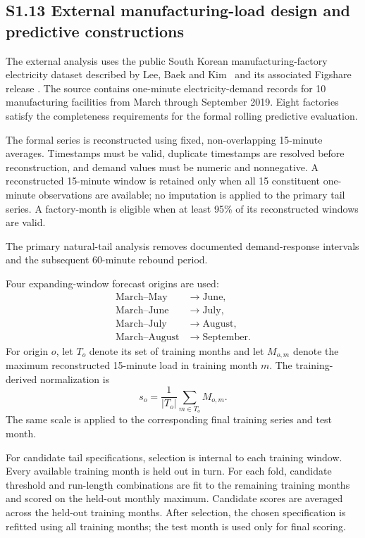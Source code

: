 \documentclass[]{interact}
\begin{document}

\subsection*{S1.13 External manufacturing-load design and predictive constructions}

The external analysis uses the public South Korean
manufacturing-factory electricity dataset described by Lee, Baek and
Kim~\cite{Lee2022} and its associated Figshare release
\cite{LeeFigshare}. The source contains one-minute electricity-demand
records for 10 manufacturing facilities from March through September
2019. Eight factories satisfy the completeness requirements for the
formal rolling predictive evaluation.

The formal series is reconstructed using fixed, non-overlapping
15-minute averages. Timestamps must be valid, duplicate timestamps are
resolved before reconstruction, and demand values must be numeric and
nonnegative. A reconstructed 15-minute window is retained only when
all 15 constituent one-minute observations are available; no
imputation is applied to the primary tail series. A factory-month is
eligible when at least 95\% of its reconstructed windows are valid.

The primary natural-tail analysis removes documented demand-response
intervals and the subsequent 60-minute rebound period.

Four expanding-window forecast origins are used:
\[
\begin{aligned}
\text{March--May}&\rightarrow\text{June},\\
\text{March--June}&\rightarrow\text{July},\\
\text{March--July}&\rightarrow\text{August},\\
\text{March--August}&\rightarrow\text{September}.
\end{aligned}
\]
For origin \(o\), let \(T_o\) denote its set of training months and
let \(M_{o,m}\) denote the maximum reconstructed 15-minute load in
training month \(m\). The training-derived normalization is
\[
s_o
=
\frac{1}{|T_o|}
\sum_{m\in T_o}
M_{o,m}.
\]
The same scale is applied to the corresponding final training series
and test month.

For candidate tail specifications, selection is internal to each
training window. Every available training month is held out in turn.
For each fold, candidate threshold and run-length combinations are fit to
the remaining training months and scored on the held-out monthly maximum.
Candidate scores are averaged across the held-out training months. After
selection, the chosen specification is refitted using all training months;
the test month is used only for final scoring.
\end{document}
